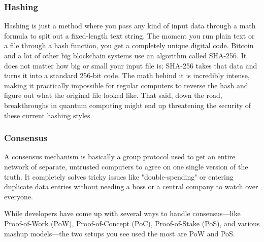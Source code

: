 



\subsubsection{Hashing}
Hashing is just a method where you pass any kind of input data through a math formula to spit out a fixed-length text string\cite{yaga2018blockchain}. The moment you run plain text or a file through a hash function, you get a completely unique digital code. Bitcoin and a lot of other big blockchain systems use an algorithm called SHA-256\cite{wikipedia_bitcoin}. It does not matter how big or small your input file is; SHA-256 takes that data and turns it into a standard 256-bit code. The math behind it is incredibly intense, making it practically impossible for regular computers to reverse the hash and figure out what the original file looked like. That said, down the road, breakthroughs in quantum computing might end up threatening the security of these current hashing styles.

\subsubsection{Consensus}
A consensus mechanism is basically a group protocol used to get an entire network of separate, untrusted computers to agree on one single version of the truth. It completely solves tricky issues like "double-spending" or entering duplicate data entries without needing a boss or a central company to watch over everyone\cite{morel2023bitcoin}.

While developers have come up with several ways to handle consensus—like Proof-of-Work (PoW), Proof-of-Concept (PoC), Proof-of-Stake (PoS), and various mashup models\cite{nguyen2019pos}—the two setups you see used the most are PoW and PoS.

